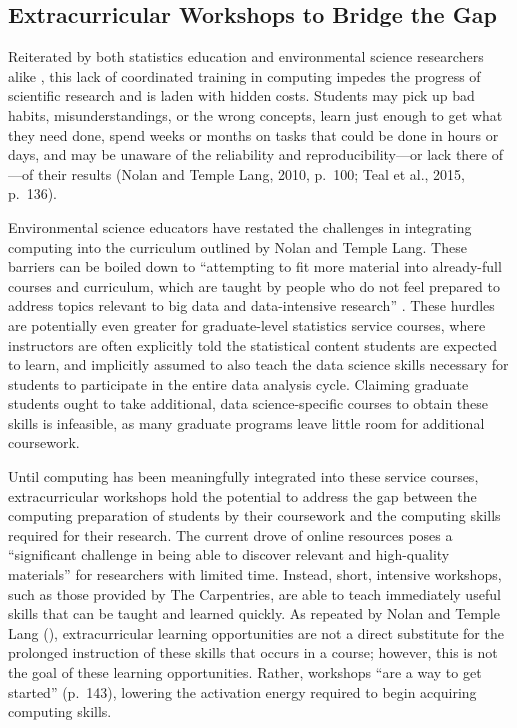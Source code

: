 \documentclass[12pt]{article}
\begin{document}
\subsection{Extracurricular Workshops to Bridge the Gap}

\noindent Reiterated by both statistics education and environmental science 
researchers alike \citep{nolan, carpentry}, this lack of coordinated training in 
computing impedes the progress of scientific research and is 
laden with hidden costs. Students may pick up bad habits, misunderstandings, or 
the wrong concepts, learn just enough to get what they need done, spend weeks or
months on tasks that could be done in hours or days, and may be unaware of 
the reliability and reproducibility---or lack there of---of their results (Nolan
and Temple Lang, 2010, p.\ 100; Teal et al., 2015, p.\ 136). 

\quad Environmental science educators have restated the challenges in 
integrating computing into the curriculum outlined by Nolan and Temple Lang. 
These barriers can be boiled down to ``attempting to fit more material into
already-full courses and curriculum, which are taught by people who do not feel
prepared to address topics relevant to big data and data-intensive research'' 
\citep[p.\ 547]{hampton}. These hurdles are potentially even greater for 
graduate-level statistics service courses, where instructors are often
explicitly told the statistical content students are expected to learn, and 
implicitly assumed to also teach the data science skills necessary for students 
to participate in the entire data analysis cycle. Claiming graduate students
ought to take additional, data science-specific courses to obtain these skills
is infeasible, as many graduate programs leave little room for
additional coursework. 

\quad Until computing has been meaningfully integrated into these service 
courses, extracurricular workshops hold the potential to address the gap between
the computing preparation of students by their coursework and the 
computing skills required for their research. The current drove of online
resources poses a ``significant challenge
in being able to discover relevant and high-quality materials'' 
\citep[p.\ 136]{carpentry} for researchers with limited time. Instead, short,
intensive workshops, such as those provided by The Carpentries, are able to
teach immediately useful skills that can be taught and learned quickly. As
repeated by Nolan and Temple Lang (\citeyear{esr}), extracurricular
learning opportunities are not a direct substitute for the prolonged instruction
of these skills that occurs in a course; however, this is not the goal of these
learning opportunities. Rather, workshops ``are a way to get started'' 
(p.\ 143),  lowering the activation energy required to begin acquiring computing
skills. 
\end{document}
